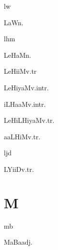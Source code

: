 \begin{multicols*}{2}
\begin{dictroot}{l}{w}
    \begin{dictentry}{LaW}{n.}
    \end{dictentry}
\end{dictroot}

\begin{dictroot}{lh}{m}
    \begin{dictentry}{LeHaM}{n.}
    \end{dictentry}
    \begin{dictentry}{LeHiiM}{v.tr}
    \end{dictentry}
    \begin{dictentry}{LeHiyaM}{v.intr.}
    \end{dictentry}
    \begin{dictentry}{iLHaaM}{v.intr.}
    \end{dictentry}
    \begin{dictentry}{LeHiLHiyaM}{v.tr.}
    \end{dictentry}
    \begin{dictentry}{aaLHiM}{v.tr.}
    \end{dictentry}
\end{dictroot}

\begin{dictroot}{lj}{d}
    \begin{dictentry}{LYiiD}{v.tr.}
    \end{dictentry}
\end{dictroot}

\section*{M}

\begin{dictroot}{m}{b}
    \begin{dictentry}{MaBa}{adj.}
    \end{dictentry}
\end{dictroot}


\end{multicols*}
